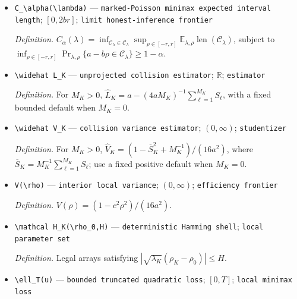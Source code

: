 \documentclass{article}
\begin{document}
\begin{itemize}
  \par\smallskip\noindent\emph{Definition.} \(C_{K,\alpha}=\inf_{\mathcal C_K\in\mathscr C_K}\sup_{\theta\in\mathcal T_K(r)}\mathbb E_\theta\operatorname{len}(\mathcal C_K)\), subject to \(\inf_{\theta\in\mathcal T_K(r)}\Pr_\theta\{L_K\in\mathcal C_K\}\ge1-\alpha\).
  \item \texttt{C\_\allowbreak{}\textbackslash{}\allowbreak{}alpha(\textbackslash{}\allowbreak{}lambda)} --- \texttt{marked-\allowbreak{}Poisson minimax expected interval length}; \([0,2br]\); \texttt{limit honest-\allowbreak{}inference frontier}
  \par\smallskip\noindent\emph{Definition.} \(C_\alpha(\lambda)=\inf_{\mathcal C_\lambda\in\mathscr C_{\lambda}}\sup_{\rho\in[-r,r]}\mathbb E_{\lambda,\rho}\operatorname{len}(\mathcal C_\lambda)\), subject to \(\inf_{\rho\in[-r,r]}\Pr_{\lambda,\rho}\{a-b\rho\in\mathcal C_\lambda\}\ge1-\alpha\).
  \item \texttt{\textbackslash{}\allowbreak{}widehat L\_\allowbreak{}K} --- \texttt{unprojected collision estimator}; \(\mathbb R\); \texttt{estimator}
  \par\smallskip\noindent\emph{Definition.} For \(M_K>0\), \(\widehat L_K=a-(4aM_K)^{-1}\sum_{\ell=1}^{M_K}S_\ell\), with a fixed bounded default when \(M_K=0\).
  \item \texttt{\textbackslash{}\allowbreak{}widehat V\_\allowbreak{}K} --- \texttt{collision variance estimator}; \((0,\infty)\); \texttt{studentizer}
  \par\smallskip\noindent\emph{Definition.} For \(M_K>0\), \(\widehat V_K=(1-\overline S_K^2+M_K^{-1})/(16a^2)\), where \(\overline S_K=M_K^{-1}\sum_{\ell=1}^{M_K}S_\ell\); use a fixed positive default when \(M_K=0\).
  \item \texttt{V(\textbackslash{}\allowbreak{}rho)} --- \texttt{interior local variance}; \((0,\infty)\); \texttt{efficiency frontier}
  \par\smallskip\noindent\emph{Definition.} \(V(\rho)=(1-c^2\rho^2)/(16a^2)\).
  \item \texttt{\textbackslash{}\allowbreak{}mathcal H\_\allowbreak{}K(\textbackslash{}\allowbreak{}rho\_\allowbreak{}0,\allowbreak{}H)} --- \texttt{deterministic Hamming shell}; \texttt{local parameter set}
  \par\smallskip\noindent\emph{Definition.} Legal arrays satisfying \(|\sqrt{\lambda_K}(\rho_K-\rho_0)|\le H\).
  \item \texttt{\textbackslash{}\allowbreak{}ell\_\allowbreak{}T(u)} --- \texttt{bounded truncated quadratic loss}; \([0,T]\); \texttt{local minimax loss}

\end{itemize}
\end{document}
